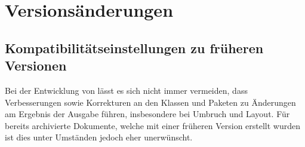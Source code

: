 \chapter{Versionsänderungen}
\section{%
  Kompatibilitätseinstellungen zu früheren Versionen%
}

Bei der Entwicklung von \TUDScript lässt es sich nicht immer vermeiden, dass 
Verbesserungen sowie Korrekturen an den Klassen und Paketen zu Änderungen am 
Ergebnis der Ausgabe führen, insbesondere bei Umbruch und Layout. Für bereits
archivierte Dokumente, welche mit einer früheren Version erstellt wurden ist 
dies unter Umständen jedoch eher unerwünscht.

